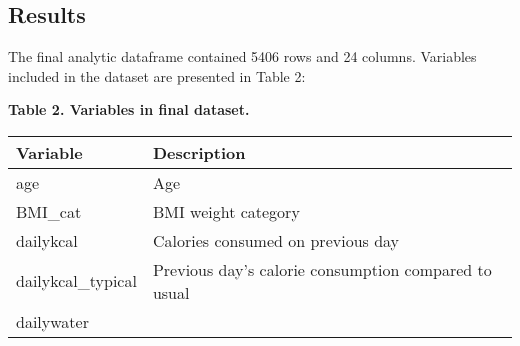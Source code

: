 \documentclass[]{article}
\begin{document}
\hypertarget{results}{%
\subsection{\texorpdfstring{\textbf{Results}}{Results}}\label{results}}

The final analytic dataframe contained 5406 rows and 24 columns.
Variables included in the dataset are presented in Table 2:

\textbf{Table 2. Variables in final dataset.}

\begin{longtable}[]{@{}ll@{}}
\toprule
\begin{minipage}[b]{0.24\columnwidth}\raggedright
Variable\strut
\end{minipage} & \begin{minipage}[b]{0.70\columnwidth}\raggedright
Description\strut
\end{minipage}\tabularnewline
\midrule
\endhead
\begin{minipage}[t]{0.24\columnwidth}\raggedright
age\strut
\end{minipage} & \begin{minipage}[t]{0.70\columnwidth}\raggedright
Age\strut
\end{minipage}\tabularnewline
\begin{minipage}[t]{0.24\columnwidth}\raggedright
BMI\_cat\strut
\end{minipage} & \begin{minipage}[t]{0.70\columnwidth}\raggedright
BMI weight category\strut
\end{minipage}\tabularnewline
\begin{minipage}[t]{0.24\columnwidth}\raggedright
dailykcal\strut
\end{minipage} & \begin{minipage}[t]{0.70\columnwidth}\raggedright
Calories consumed on previous day\strut
\end{minipage}\tabularnewline
\begin{minipage}[t]{0.24\columnwidth}\raggedright
dailykcal\_typical\strut
\end{minipage} & \begin{minipage}[t]{0.70\columnwidth}\raggedright
Previous day's calorie consumption compared to usual\strut
\end{minipage}\tabularnewline
\begin{minipage}[t]{0.24\columnwidth}\raggedright
dailywater\strut
\end{minipage} & \begin{minipage}[t]{0.70\columnwidth}\raggedright

\end{minipage}
\end{longtable}
\end{document}
